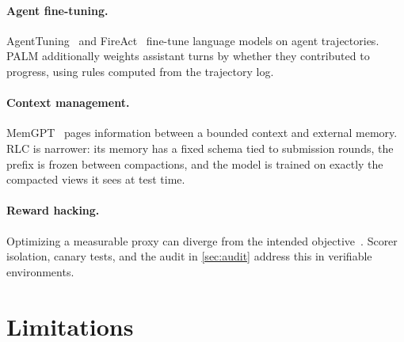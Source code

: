 \documentclass[11pt]{article}
\begin{document}
\paragraph{Agent fine-tuning.}
AgentTuning~\citep{zeng2023agenttuning} and FireAct~\citep{chen2023fireact} fine-tune language models on agent trajectories. PALM additionally weights assistant turns by whether they contributed to progress, using rules computed from the trajectory log.

\paragraph{Context management.}
MemGPT~\citep{packer2023memgpt} pages information between a bounded context and external memory. RLC is narrower: its memory has a fixed schema tied to submission rounds, the prefix is frozen between compactions, and the model is trained on exactly the compacted views it sees at test time.

\paragraph{Reward hacking.}
Optimizing a measurable proxy can diverge from the intended objective~\citep{skalse2022rewardhacking}. Scorer isolation, canary tests, and the audit in \cref{sec:audit} address this in verifiable environments.

\section{Limitations}
\label{sec:limitations}
\end{document}
